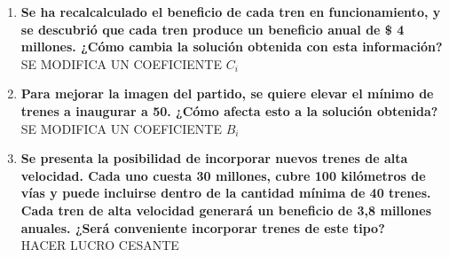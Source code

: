 \documentclass[10pt, a4paper, titlepage,
	oneside,
	fleqn, leqno]{article}
\let\oldsection\section
\def\section{\cleardoublepage\oldsection}
\begin{document}
\begin{enumerate} [a .]
\section{Parte B}
A partir del resultado de la corrida del TP y del análisis de sensibilidad, responder las siguientes preguntas. Si consideran que les falta información, indicar qué información les falta y porqué. NO SE DEBE REALIZAR UNA NUEVA CORRIDA DEL TP ( ni por LINDO, ni por simplex). Tener en cuenta que lo que se espera de esta entrega es que sepan sacar el máximo provecho de la información disponible. Cada una de la preguntas es independiente de las demás.
\item \textbf{Se ha recalcalculado el beneficio de cada tren en funcionamiento, y se descubrió que cada tren produce un beneficio anual de \$ 4 millones. ¿Cómo cambia la solución obtenida con esta información?}\\
SE MODIFICA UN COEFICIENTE $C_i$
\item \textbf{Para mejorar la imagen del partido, se quiere elevar el mínimo de trenes a inaugurar a 50. ¿Cómo afecta esto a la solución obtenida?}\\
SE MODIFICA UN COEFICIENTE $B_i$
\item \textbf{Se presenta la posibilidad de incorporar nuevos trenes de alta velocidad. Cada uno cuesta 30 millones, cubre 100 kilómetros de vías y puede incluirse dentro de la cantidad mínima de 40 trenes. Cada tren de alta velocidad generará un beneficio de 3,8 millones anuales. ¿Será conveniente incorporar trenes de este tipo?}\\
HACER LUCRO CESANTE
\end{enumerate}
\end{document}

